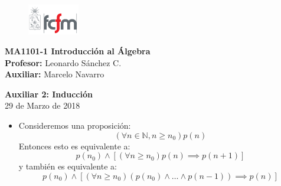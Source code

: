 \documentclass[letterpaper,11pt]{article}
\newcommand{\N}{\mathbb N}
\theoremstyle{plain}
\begin{document}
\newpage
\pagestyle{fancy}
\fancyhf{}

\begin{figure} %
    \vspace{-5mm}
    \includegraphics[width=0.2\textwidth]{img/fcfm2.png}
\end{figure}


\noindent
\textbf{MA1101-1 Introducción al Álgebra}\\
\textbf{Profesor: }Leonardo Sánchez C.\\
\textbf{Auxiliar: }Marcelo Navarro

\begin{center}
{\bf \Large Auxiliar 2: Inducción}\\
{29 de Marzo de 2018}
\end{center}

\begin{framed}
			\begin{itemize}
				\item Consideremos una proposición:
$$
(\forall n\in \N , n \geq n_0 )p(n)
$$
Entonces esto es equivalente a:
$$
p(n_0) \land [(\forall n\geq n_0) p(n) \implies p(n+1)]
$$
y también es equivalente a:
$$
p(n_0) \land [(\forall n\geq n_0) (p(n_0) \land \dots \land p(n-1) )\implies p(n)]
$$
			\end{itemize}	
\end{framed}
\end{document}
